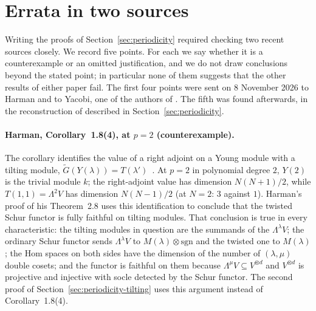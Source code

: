 
\section{Errata in two sources}\label{sec:errata}

Writing the proofs of Section~\ref{sec:periodicity} required checking two recent sources
closely.  We record five points.  For each we say whether it is a counterexample or an
omitted justification, and we do not draw conclusions beyond the stated point; in
particular none of them suggests that the other results of either paper fail.  The
first four points were sent on 8 November 2026 to Harman and to Yacobi, one of the authors
of \cite{hone2025}.  The fifth was found afterwards, in the reconstruction of
\cite[Thm.~8.4.5]{hone2025} described in Section~\ref{sec:periodicity}.

\paragraph{Harman, Corollary~1.8(4), at $p=2$ (counterexample).}  The corollary identifies
the value of a right adjoint on a Young module with a tilting module,
$\tilde G(Y(\lambda))=T(\lambda')$~\cite[Thm.~1.7(4), Cor.~1.8(4)]{harman2015}.  At $p=2$ in
polynomial degree $2$, $Y(2)$ is the trivial module $k$; the right-adjoint value has
dimension $N(N+1)/2$, while $T(1,1)=\Lambda^2V$ has dimension $N(N-1)/2$ (at $N=2$: $3$ against
$1$).  Harman's proof of his Theorem~2.8 uses this identification to conclude that the
twisted Schur functor is fully faithful on tilting modules.  That conclusion is true in every
characteristic: the tilting modules in question are the summands of the $\Lambda^\lambda V$;
the ordinary Schur functor sends $\Lambda^\lambda V$ to $M(\lambda)\otimes\mathrm{sgn}$ and
the twisted one to $M(\lambda)$; the
Hom spaces on both sides have the dimension of the number of $(\lambda,\mu)$ double cosets;
and the functor is faithful on them because $\Lambda^\mu V\subseteq V^{\otimes d}$ and
$V^{\otimes d}$ is projective and injective with socle detected by the Schur functor.  The
second proof of Section~\ref{sec:periodicity-tilting} uses this argument instead of
Corollary~1.8(4).

